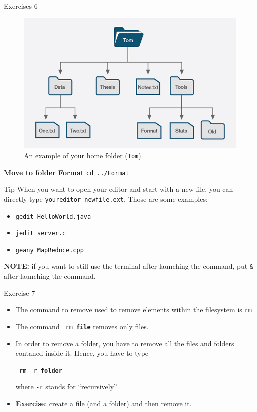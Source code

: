 \documentclass{beamer}
\begin{document}
\begin{frame}{Exercises 6}
	\begin{figure}
		\centering
		\includegraphics[width=0.7\linewidth]{00shell}
		\caption{An example of your home folder (\texttt{Tom})}
		\label{fig:00shell}
	\end{figure}
	\textbf{Move to folder Format} \pause \texttt{cd ../Format}
\end{frame}

\begin{frame}{Tip}
	When you want to open your editor and start with a new file, you can directly type \texttt{youreditor newfile.ext}. Those are some examples:
	\begin{itemize}
		\item \texttt{gedit HelloWorld.java}
		\item \texttt{jedit server.c}
		\item \texttt{geany MapReduce.cpp}
	\end{itemize}
 \textbf{NOTE:} if you want to still use the terminal after launching the command, put \texttt{\&} after launching the command.
\end{frame}

\begin{frame}{Exercise 7}
	\begin{itemize}
		\item The command to remove used to remove elements within the filesystem is \texttt{rm}
		\item The command  \texttt{\color{green} rm \textbf{\color{blue} file}} removes only files.
		\item In order to remove a folder, you have to remove all the files and folders contaned inside it. Hence, you have to type  \begin{center}
			\texttt{\color{green} rm -r \textbf{\color{blue} folder}}
		\end{center} where \texttt{-r} stands for ``recursively''
		\item \textbf{Exercise}: create a file (and a folder) and then remove it.
	\end{itemize}
\end{frame}
\end{document}
